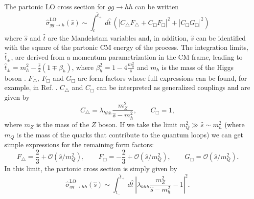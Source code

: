 The partonic LO cross section for $gg\rightarrow hh$ can be written
\begin{equation}
\hat{\sigma}^{\text{LO}}_{gg\rightarrow h} (\hat{s}) \sim \int_{\hat{t}_-}^{\hat{t}_+}~d\hat{t}~\left(|C_{\bigtriangleup}F_{\bigtriangleup}+C_{\Box}F_{\Box}|^2+|C_{\Box}G_{\Box}|^2\right)
\end{equation}
where $\hat{s}$ and $\hat{t}$ are the Mandelstam variables and, in addition, $\hat{s}$ can be identified with the square of the partonic CM energy of the process. The integration limits, $\hat{t}_{\pm}$, are derived from a momentum parametrization in the CM frame, leading to $\hat{t}_{\pm}=m_h^2-\frac{\hat{s}}{2}(1\mp \beta_h)$, where $\beta_h^2=1-4\frac{m_h^2}{\hat{s}}$ and $m_h$ is the mass of the Higgs boson \cite{HHxs_LO1}. $F_{\bigtriangleup}$, $F_{\Box}$ and $G_{\Box}$ are form factors whose full expressions can be found, for example, in Ref. \cite{HHxs_LO}. $C_{\bigtriangleup}$ and $C_{\Box}$ can be interpreted as generalized couplings and are given by
\begin{equation}
C_{\bigtriangleup}=\lambda_{hhh}\frac{m_Z^2}{\hat{s}-m_h^2}, \qquad C_{\Box}=1,
\end{equation}
where $m_Z$ is the mass of the $Z$ boson.
If we take the limit $m_Q^2 \gg \hat{s}\sim m_h^2$ (where $m_Q$ is the mass of the quarks that contribute to the quantum loops) we can get simple expressions for the remaining form factors:
\begin{equation}
F_{\bigtriangleup}=\frac{2}{3} + \mathcal{O}(\hat{s}/m_Q^2), \qquad F_{\Box}=-\frac{2}{3} + \mathcal{O}(\hat{s}/m_Q^2), \qquad G_{\Box}=\mathcal{O}(\hat{s}/m_Q^2).
\end{equation}
In this limit, the partonic cross section is simply given by 
\begin{equation}
\hat{\sigma}^{\text{LO}}_{gg\rightarrow hh}(\hat{s}) \sim \int_{\hat{t}_-}^{\hat{t}_+}~d\hat{t}~ |\lambda_{hhh}\frac{m_Z^2}{\hat{s}-m_h^2}-1|^2.
\label{eq:xsparton}
\end{equation}

%

